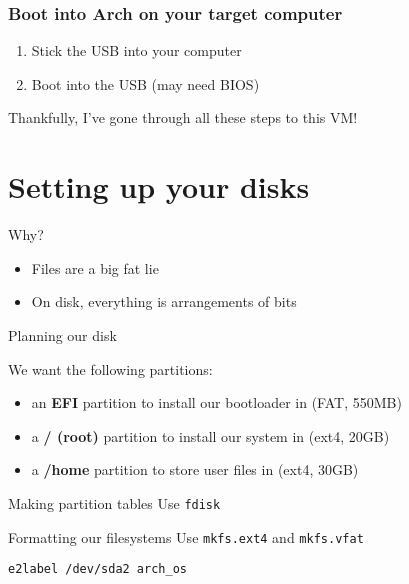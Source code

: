 \documentclass{beamer}
\begin{document}
\begin{frame}
    \frametitle{Boot into Arch on your target computer}

    \begin{enumerate}
        \item Stick the USB into your computer
        \item Boot into the USB (may need BIOS)
    \end{enumerate}
\end{frame}

\begin{frame}
    \Huge
    \centering

    Thankfully, I've gone through all these steps to this VM!
\end{frame}

\section{Setting up your disks}

\begin{frame}{Why?}
    
    \begin{itemize}
        \item Files are a big fat lie
        \item On disk, everything is arrangements of bits
    \end{itemize}
\end{frame}

\begin{frame}{Planning our disk}

    We want the following partitions:
    \begin{itemize}
        \item an \textbf{EFI} partition to install our bootloader in (FAT, 550MB)
        \item a \textbf{/ (root)} partition to install our system in (ext4, 20GB)
        \item a \textbf{/home} partition to store user files in (ext4, 30GB)
    \end{itemize}
\end{frame}

\begin{frame}{Making partition tables}
    Use \texttt{fdisk}
\end{frame}

\begin{frame}{Formatting our filesystems}
    Use \texttt{mkfs.ext4} and \texttt{mkfs.vfat}

    \texttt{e2label /dev/sda2 arch\_os}
\end{frame}
\end{document}
